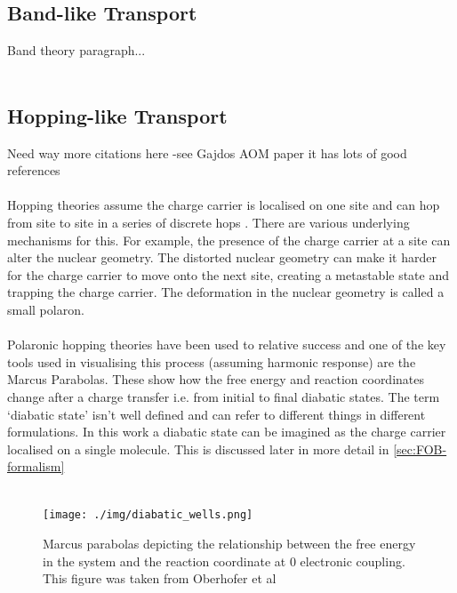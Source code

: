 \subsection{Band-like Transport}
{\LARGE Band theory paragraph...}
\\\\
\subsection{Hopping-like Transport}
{\Large Need way more citations here -see Gajdos AOM paper it has lots of good references}
\\\\
Hopping theories assume the charge carrier is localised on one site and can hop from site to site in a series of discrete hops \cite{oberhofer_charge_2017}. There are various underlying mechanisms for this. For example, the presence of the charge carrier at a site can alter the nuclear geometry. The distorted nuclear geometry can make it harder for the charge carrier to move onto the next site, creating a metastable state and trapping the charge carrier. The deformation in the nuclear geometry is called a small polaron.
\\\\
Polaronic hopping theories have been used to relative success and one of the key tools used in visualising this process (assuming harmonic response) are the Marcus Parabolas. These show how the free energy and reaction coordinates change after a charge transfer i.e. from initial to final diabatic states. The term `diabatic state' isn't well defined and can refer to different things in different formulations. In this work a diabatic state can be imagined as the charge carrier localised on a single molecule. This is discussed later in more detail in  \ref{sec:FOB-formalism}\\
\\
\begin{figure}[ht]
  \texttt{[image: ./img/diabatic\_wells.png]}
  \caption{Marcus parabolas depicting the relationship between the free energy in the system and the reaction coordinate at 0 electronic coupling. This figure was taken from Oberhofer et al \cite{oberhofer_charge_2017}}
  \label{fig:diab_wells}
\end{figure}
\\
